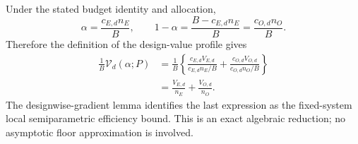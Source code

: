 Under the stated budget identity and allocation,
\[
 \alpha=\frac{c_{E,d}n_E}{B},\qquad
 1-\alpha=\frac{B-c_{E,d}n_E}{B}=\frac{c_{O,d}n_O}{B}.
\]
Therefore the definition of the design-value profile gives
\[
\begin{aligned}
 \frac1B\mathcal V_d(\alpha;P)
 &=\frac1B\left\{
 \frac{c_{E,d}V_{E,d}}{c_{E,d}n_E/B}
 +\frac{c_{O,d}V_{O,d}}{c_{O,d}n_O/B}\right\}\\
 &=\frac{V_{E,d}}{n_E}+\frac{V_{O,d}}{n_O}.
\end{aligned}
\]
The designwise-gradient lemma identifies the last expression as the fixed-system local semiparametric efficiency bound.  This is an exact algebraic reduction; no asymptotic floor approximation is involved.